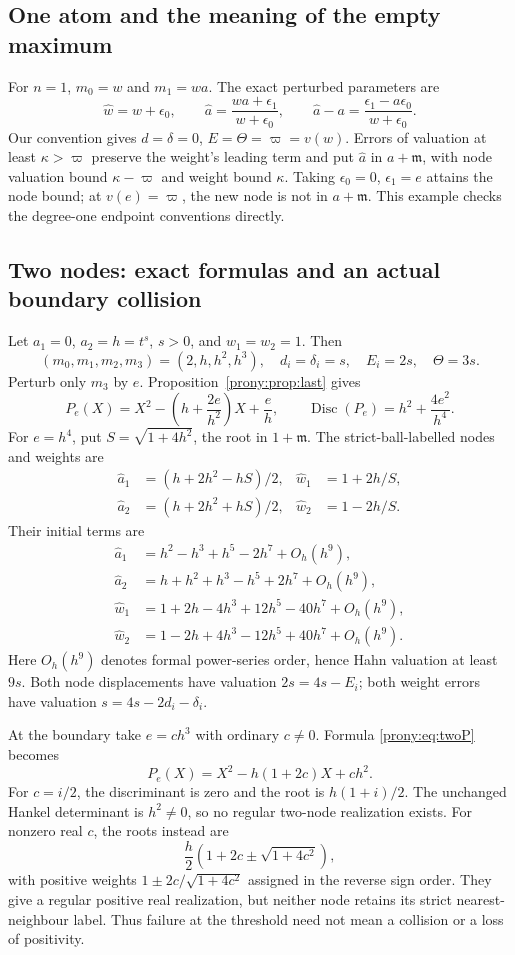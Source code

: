 \documentclass[11pt,letterpaper]{article}
\theoremstyle{definition}
\theoremstyle{remark}
\newcommand{\mfr}{\mathfrak m}
\newcommand{\ah}{\widehat a}
\newcommand{\wh}{\widehat w}
\DeclareMathOperator{\Disc}{Disc}
\begin{document}
\subsection{One atom and the meaning of the empty maximum}
For $n=1$, $m_0=w$ and $m_1=wa$. The exact perturbed parameters are
\[
 \wh=w+\epsilon_0,\qquad
 \ah=\frac{wa+\epsilon_1}{w+\epsilon_0},\qquad
 \ah-a=\frac{\epsilon_1-a\epsilon_0}{w+\epsilon_0}.
\]
Our convention gives $d=\delta=0$, $E=\Theta=\varpi=v(w)$.
Errors of valuation at least $\kappa>\varpi$ preserve the weight's leading
term and put $\ah$ in $a+\mfr$, with node valuation bound
$\kappa-\varpi$ and weight bound $\kappa$. Taking
$\epsilon_0=0$, $\epsilon_1=e$ attains the node bound; at
$v(e)=\varpi$, the new node is not in $a+\mfr$.
This example checks the degree-one endpoint conventions directly.

\subsection{Two nodes: exact formulas and an actual boundary collision}
Let $a_1=0$, $a_2=h=t^s$, $s>0$, and $w_1=w_2=1$. Then
\[
 (m_0,m_1,m_2,m_3)=(2,h,h^2,h^3),\quad
 d_i=\delta_i=s,\quad E_i=2s,\quad\Theta=3s.
\]
Perturb only $m_3$ by $e$. Proposition~\ref{prony:prop:last} gives
\begin{equation}\label{prony:eq:twoP}
 P_e(X)=X^2-\left(h+\frac{2e}{h^2}\right)X+\frac eh,
 \qquad \Disc(P_e)=h^2+\frac{4e^2}{h^4}.
\end{equation}
For $e=h^4$, put $S=\sqrt{1+4h^2}$, the root in $1+\mfr$.
The strict-ball-labelled nodes and weights are
\begin{align*}
 \ah_1&=(h+2h^2-hS)/2,&\wh_1&=1+2h/S,\\
 \ah_2&=(h+2h^2+hS)/2,&\wh_2&=1-2h/S.
\end{align*}
Their initial terms are
\begin{align*}
 \ah_1&=h^2-h^3+h^5-2h^7+O_h(h^9),\\
 \ah_2&=h+h^2+h^3-h^5+2h^7+O_h(h^9),\\
 \wh_1&=1+2h-4h^3+12h^5-40h^7+O_h(h^9),\\
 \wh_2&=1-2h+4h^3-12h^5+40h^7+O_h(h^9).
\end{align*}
Here $O_h(h^9)$ denotes formal power-series order, hence Hahn valuation
at least $9s$. Both node displacements have valuation $2s=4s-E_i$;
both weight errors have valuation $s=4s-2d_i-\delta_i$.

At the boundary take $e=c h^3$ with ordinary $c\ne0$. Formula
\eqref{prony:eq:twoP} becomes
\[
 P_e(X)=X^2-h(1+2c)X+ch^2.
\]
For $c=i/2$, the discriminant is zero and the root is
$h(1+i)/2$. The unchanged Hankel determinant is $h^2\ne0$, so no regular
two-node realization exists. For nonzero real $c$, the roots instead are
\[
 \frac h2\left(1+2c\pm\sqrt{1+4c^2}\right),
\]
with positive weights
$1\pm2c/\sqrt{1+4c^2}$ assigned in the reverse sign order.
They give a regular positive real realization, but neither node retains
its strict nearest-neighbour label. Thus failure at the threshold need
not mean a collision or a loss of positivity.
\end{document}
